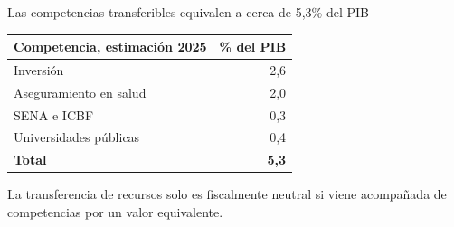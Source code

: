 \begin{frame}{Las competencias transferibles equivalen a cerca de 5,3\% del PIB}
\centering
\small
\begin{tabular}{lr}
\toprule
\textbf{Competencia, estimación 2025} & \textbf{\% del PIB} \\
\midrule
Inversión                              & 2,6 \\
Aseguramiento en salud                 & 2,0 \\
SENA e ICBF                            & 0,3 \\
Universidades públicas                 & 0,4 \\
\midrule
\textbf{Total}                         & \textbf{5,3} \\
\bottomrule
\end{tabular}
\vspace{0.25cm}
\scriptsize La transferencia de recursos solo es fiscalmente neutral si viene acompañada de competencias por un valor equivalente.
\end{frame}